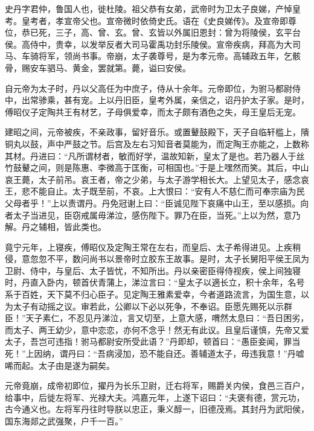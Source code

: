 \documentclass[12pt,UTF8]{ctexbook}
\begin{document}
史丹字君仲，鲁国人也，徙杜陵。祖父恭有女弟，武帝时为卫太子良娣，产悼皇考。皇考者，孝宣帝父也。宣帝微时依倚史氏。语在《史良娣传》。及宣帝即尊位，恭已死，三子，高、曾、玄。曾、玄皆以外属旧恩封：曾为将陵侯，玄平台侯。高侍中，贵幸，以发举反者大司马霍禹功封乐陵侯。宣帝疾病，拜高为大司马、车骑将军，领尚书事。帝崩，太子袭尊号，是为孝元帝。高辅政五年，乞骸骨，赐安车驷马、黄金，罢就第。薨，谥曰安侯。



自元帝为太子时，丹以父高任为中庶子，侍从十余年。元帝即位，为驸马都尉侍中，出常骖乘，甚有宠。上以丹旧臣，皇考外属，亲信之，诏丹护太子家。是时，傅昭仪子定陶共王有材艺，子母俱爱幸，而太子颇有酒色之失，母王皇后无宠。



建昭之间，元帝被疾，不亲政事，留好音乐。或置鼙鼓殿下，天子自临轩槛上，隤铜丸以鼓，声中严鼓之节。后宫及左右习知音者莫能为，而定陶王亦能之，上数称其材。丹进曰：“凡所谓材者，敏而好学，温故知新，皇太了是也。若乃器人于丝竹鼓鼙之间，则是陈惠、李微高于匡衡，可相国也。”于是上嘿然而笑。其后，中山哀王薨，太子前吊。哀王者，帝之少弟，与太子游学相长大。上望见太子，感念哀王，悲不能自止。太子既至前，不哀。上大恨曰：“安有人不慈仁而可奉宗庙为民父母者乎！”上以责谓丹。丹免冠谢上曰：“臣诚见陛下哀痛中山王，至以感损。向者太子当进见，臣窃戒属毋涕泣，感伤陛下。罪乃在臣，当死。”上以为然，意乃解。丹之辅相，皆此类也。



竟宁元年，上寝疾，傅昭仪及定陶王常在左右，而皇后、太子希得进见。上疾稍侵，意忽忽不平，数问尚书以景帝时立胶东王故事。是时，太子长舅阳平侯王凤为卫尉、侍中，与皇后、太子皆忧，不知所出。丹以亲密臣得侍视疾，侯上间独寝时，丹直入卧内，顿首伏青蒲上，涕泣言曰：“皇太子以適长立，积十余年，名号系于百姓，天下莫不归心臣子。见定陶王雅素爱幸，今者道路流言，为国生意，以为太子有动摇之议。审若此，公卿以下必以死争，不奉诏。臣愿先赐死以示群臣！”天子素仁，不忍见丹涕泣，言又切至，上意大感，喟然太息曰：“吾日困劣，而太子、两王幼少，意中恋恋，亦何不念乎！然无有此议。且皇后谨慎，先帝又爱太子，吾岂可违指！驸马都尉安所受此语？”丹即却，顿首曰：“愚臣妾闻，罪当死！”上因纳，谓丹曰：“吾病浸加，恐不能自还。善辅道太子，毋违我意！”丹嘘唏而起。太子由是遂为嗣矣。



元帝竟崩，成帝初即位，擢丹为长乐卫尉，迁右将军，赐爵关内侯，食邑三百户，给事中，后徙左将军、光禄大夫。鸿嘉元年，上遂下诏曰：“夫褒有德，赏元功，古今通义也。左将军丹往时导朕以忠正，秉义醇一，旧德茂焉。其封丹为武阳侯，国东海郯之武强聚，户千一百。”
\end{document}
